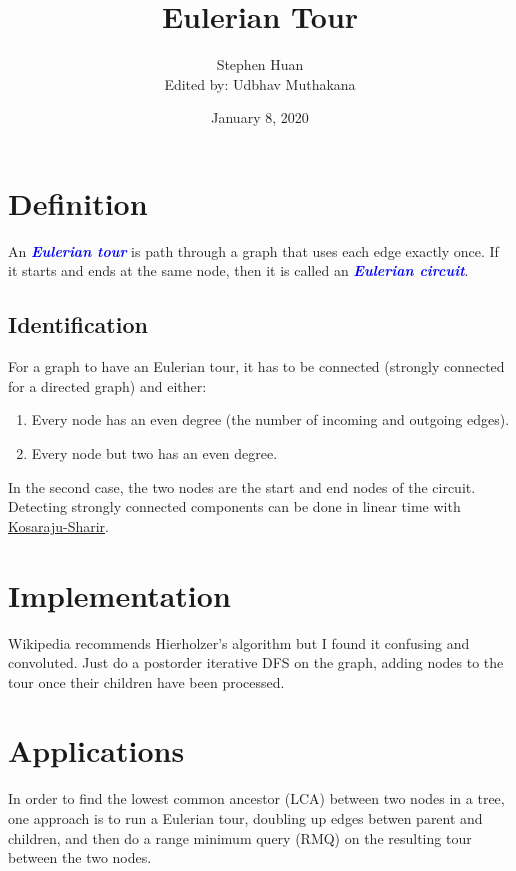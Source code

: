 \documentclass[11pt, oneside]{article}
\title{Eulerian Tour}
\author{Stephen Huan \\ Edited by: Udbhav Muthakana}
\date{January 8, 2020}
\newcommand{\emphasis}[1]{\textcolor{blue}{\textbf{\textit{#1}}}}
\begin{document}
\maketitle

\section{Definition}

An \emphasis{Eulerian tour} is path through a graph that uses each edge exactly once.
If it starts and ends at the same node, then it is called an \emphasis{Eulerian circuit}.

\subsection{Identification}
For a graph to have an Eulerian tour, it has to be connected (strongly connected for a directed graph) and either:

\begin{enumerate}
  \item Every node has an even degree (the number of incoming and outgoing edges).
  \item Every node but two has an even degree.
\end{enumerate}

In the second case, the two nodes are the start and end nodes of the circuit.
Detecting strongly connected components can be done in linear time with \href{https://activities.tjhsst.edu/sct/lectures/1920/2019_11_01_Strongly_Connected_Components.pdf}{Kosaraju-Sharir}.

\section{Implementation}

Wikipedia recommends Hierholzer's algorithm but I found it confusing and convoluted.
Just do a postorder iterative DFS on the graph, adding nodes to the tour once their children have been processed.

\section{Applications}

In order to find the lowest common ancestor (LCA) between two nodes in a tree,
one approach is to run a Eulerian tour, doubling up edges betwen parent and children,
and then do a range minimum query (RMQ) on the resulting tour between the two nodes.
\end{document}
